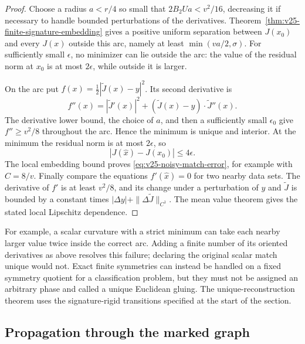 \begin{proof}
Choose a radius \(a<r/4\) so small that \(2B_2Ua<v^2/16\), decreasing
it if necessary to handle bounded perturbations of the derivatives.
Theorem~\ref{thm:v25-finite-signature-embedding} gives a positive uniform
separation between \(J(x_0)\) and every \(J(x)\) outside this arc, namely
at least \(\min(va/2,\sigma)\).  For sufficiently small \(\epsilon\),
no minimizer can lie outside the arc: the value of the residual norm at
\(x_0\) is at most \(2\epsilon\), while outside it is larger.

On the arc put \(f(x)=\tfrac12|\widetilde J(x)-y|^2\).  Its second
derivative is
\[
 f''(x)=|\widetilde J'(x)|^2+
                 (\widetilde J(x)-y)\cdot\widetilde J''(x).
\]
The derivative lower bound, the choice of \(a\), and then a sufficiently
small \(\epsilon_0\) give \(f''\ge v^2/8\) throughout the arc.
Hence the minimum is unique and interior.  At the minimum the residual norm
is at most \(2\epsilon\), so
\[
 |J(\widehat x)-J(x_0)|\le4\epsilon.
\]
The local embedding bound proves
\eqref{eq:v25-noisy-match-error}, for example with \(C=8/v\).
Finally compare the equations \(f'(\widehat x)=0\) for two nearby data
sets.  The derivative of \(f'\) is at least \(v^2/8\), and its change
under a perturbation of \(y\) and \(\widetilde J\) is bounded by a
constant times \(|\Delta y|+\|\Delta\widetilde J\|_{C^1}\).
The mean value theorem gives the stated local Lipschitz dependence.
\end{proof}

For example, a scalar curvature with a strict minimum can take each nearby
larger value twice inside the correct arc.  Adding a finite number of its
oriented derivatives as above resolves this failure; declaring the original
scalar match unique would not.  Exact finite symmetries can instead be
handled on a fixed symmetry quotient for a classification problem, but they
must not be assigned an arbitrary phase and called a unique Euclidean
gluing.  The unique-reconstruction theorem uses the signature-rigid
transitions specified at the start of the section.

\subsection{Propagation through the marked graph}


